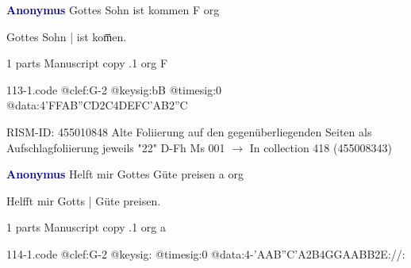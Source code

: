 \documentclass[twocolumn]{book}
\begin{document}
\newline \par \vspace{7pt} \textcolor{darkblue}{\textbf{Anonymus  }}
\newline Gottes Sohn ist kommen  F  
\newline org
\newline \begin{itshape}[f.21v, at left:] Gottes Sohn | ist kom̅en.\end{itshape} 
\newline \textcolor{darkblue}{}  1 parts  
\newline Manuscript copy
.1  org  F  
\begin{filecontents*}{113-1.code}
@clef:G-2
@keysig:bB
@timesig:0
@data:4'FFAB''CD2C4DEFC'AB2''C
\end{filecontents*}
\newline
%

\newline RISM-ID: 455010848
\newline Alte Foliierung auf den gegenüberliegenden Seiten als Aufschlagfoliierung jeweils "22"
\newline D-Fh  Ms 001
\newline $\rightarrow$ In collection 418 (455008343)

\newline \par \vspace{7pt} \textcolor{darkblue}{\textbf{Anonymus  }}
\newline Helft mir Gottes Güte preisen  a  
\newline org
\newline \begin{itshape}[f.40v, at left:] Helfft mir Gotts | Güte preisen.\end{itshape} 
\newline \textcolor{darkblue}{}  1 parts  
\newline Manuscript copy
.1  org  a  
\begin{filecontents*}{114-1.code}
@clef:G-2
@keysig:
@timesig:0
@data:4-'AAB''C'A2B4GGAABB2E://:
\end{filecontents*}
\newline
%
\end{document}
